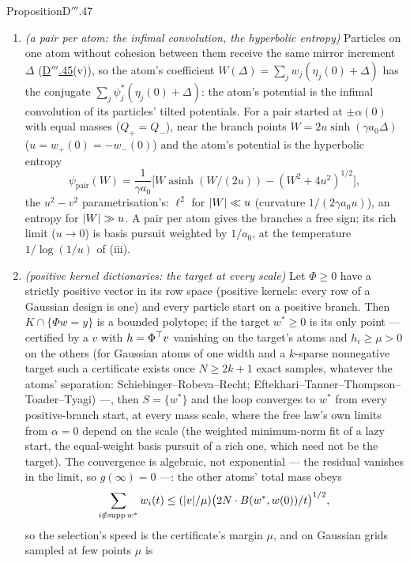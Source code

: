 \begin{thm}{Proposition}{D$'''$.47}
\begin{enumerate}[label=\textup{(\roman*)}]
    $1/(\gamma a_0)$ breaking ties ---, the free coefficients $O(1)$.
  \item \emph{(a pair per atom: the infimal convolution, the hyperbolic entropy)} Particles on one atom without cohesion
    between them receive the same mirror increment $\Delta$ (\hyperref[res:thmDppp:45]{D$'''$.45}(v)), so the atom's
    coefficient $W(\Delta) = \sum_jw_j(\eta_j(0) + \Delta)$ has the conjugate $\sum_j\psi^*_j(\eta_j(0) + \Delta)$: the
    atom's potential is the infimal convolution of its particles' tilted potentials. For a pair started at
    $\pm\alpha(0)$ with equal masses ($Q_+ = Q_-$), near the branch points $W = 2u\sinh(\gamma a_0\Delta)$
    ($u = w_+(0) = -w_-(0)$) and the atom's potential is the hyperbolic entropy
    \[
      \psi_{\mathrm{pair}}(W) = \frac1{\gamma a_0}\big[W\operatorname{asinh}(W/(2u)) - (W^2 + 4u^2)^{1/2}\big],
    \]
    the $u^2 - v^2$ parametrisation's: $\ell^2$ for $\lvert W\rvert\ll u$ (curvature $1/(2\gamma a_0u)$), an entropy for
    $\lvert W\rvert\gg u$. A pair per atom gives the branches a free sign; its rich limit ($u\to0$) is basis pursuit weighted by
    $1/a_0$, at the temperature $1/\log(1/u)$ of (iii).
  \item \emph{(positive kernel dictionaries: the target at every scale)} Let $\Phi\ge0$ have a strictly positive vector
    in its row space (positive kernels: every row of a Gaussian design is one) and every particle start on a positive
    branch. Then $K\cap\{\Phi w = y\}$ is a bounded polytope; if the target $w^*\ge0$ is its only point --- certified by
    a $v$ with $h = \Phi^\top v$ vanishing on the target's atoms and $h_i\ge\mu > 0$ on the others (for Gaussian atoms of
    one width and a $k$-sparse nonnegative target such a certificate exists once $N\ge2k + 1$ exact samples, whatever
    the atoms' separation: Schiebinger--Robeva--Recht; Eftekhari--Tanner--Thompson--Toader--Tyagi) ---, then
    $S = \{w^*\}$ and the loop converges to $w^*$ from every positive-branch start, at every mass scale, where the free
    law's own limits from $\alpha = 0$ depend on the scale (the weighted minimum-norm fit of a lazy start, the
    equal-weight basis pursuit of a rich one, which need not be the target). The convergence is algebraic, not
    exponential --- the residual vanishes in the limit, so $g(\infty) = 0$ ---: the other atoms' total mass obeys
    \[
      \sum_{i\notin\operatorname{supp} w^*}w_i(t)\le(\lvert v\rvert/\mu)\big(2N\cdot B(w^*,w(0))/t\big)^{1/2},
    \]
    so the selection's speed is the certificate's margin $\mu$, and on Gaussian grids sampled at few points $\mu$ is

\end{enumerate}
\end{thm}
